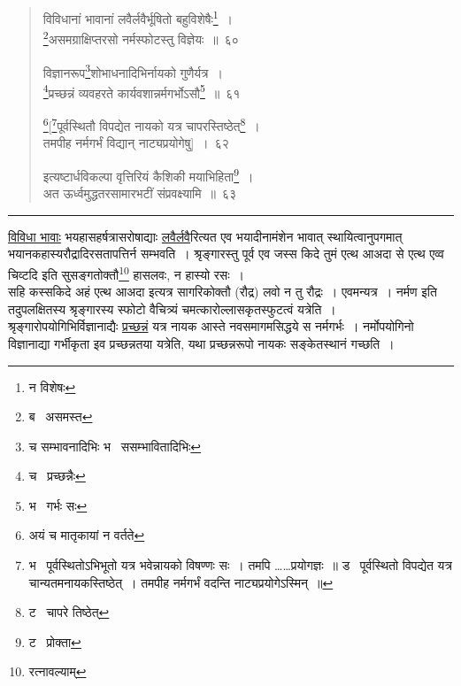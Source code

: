 \documentclass[11pt, openany]{book}
\begin{document}
\begin{quote}
{\na विविधानां भावानां लवैर्लवैर्भूषितो बहुविशेषैः\renewcommand{\thefootnote}{1}\footnote{न विशेषः}~।\\
\renewcommand{\thefootnote}{2}\footnote{ब \textendash\ असमस्त}असमग्राक्षिप्तरसो नर्मस्फोटस्तु विज्ञेयः~॥~६०

विज्ञानरूप\renewcommand{\thefootnote}{3}\footnote{च सम्भावनादिभिः भ \textendash\ ससम्भावितादिभिः}शोभाधनादिभिर्नायको गुणैर्यत्र~।\\
\renewcommand{\thefootnote}{4}\footnote{च \textendash\ प्रच्छन्नैः}प्रच्छन्नं व्यवहरते कार्यवशान्नर्मगर्भोऽसौ\renewcommand{\thefootnote}{5}\footnote{भ \textendash\ गर्भः सः}~॥~६१

\renewcommand{\thefootnote}{6}\footnote{अयं च मातृकायां न वर्तते}[\renewcommand{\thefootnote}{7}\footnote{भ \textendash\ पूर्वस्थितोऽभिभूतो यत्र भवेन्नायको विषण्णः सः~। तमपि \ldots \ldots प्रयोगज्ञः~॥ ड \textendash\ पूर्वस्थितो विपद्येत यत्र चान्यतमनायकस्तिष्ठेत्~। तमपीह नर्मगर्भं वदन्ति नाट्यप्रयोगेऽस्मिन्~॥}पूर्वस्थितौ विपद्येत नायको यत्र चापरस्तिष्ठेत्\renewcommand{\thefootnote}{8}\footnote{ट \textendash\ चापरे तिष्ठेत्}~।\\
तमपीह नर्मगर्भं विद्यान् नाट्यप्रयोगेषु]~।~६२

इत्यष्टार्धविकल्पा वृत्तिरियं कैशिकी मयाभिहिता\renewcommand{\thefootnote}{9}\footnote{ट \textendash\ प्रोक्ता}~।\\
अत ऊर्ध्वमुद्धतरसामारभटीं संप्रवक्ष्यामि~॥~६३}
\end{quote}

\hrule

\vspace{2mm}
\underline{विविधा भावाः} भयहासहर्षत्रासरोषाद्याः \underline{लवैर्लवै}रित्यत एव भयादीनामंशेन भावात् स्थायित्वानुपगमात् भयानकहास्यरौद्रादिरसतापत्तिर्न सम्भवति~। श्रृङ्गारस्तु पूर्व एव {\qt जस्स किदे तुमं एत्थ आअदा से एत्थ एव्व चिव्टदि} इति सुसङ्गतोक्तौ\renewcommand{\thefootnote}{*}\footnote{रत्नावल्याम्} हासलवः, न हास्यो रसः~।\\

{\qt सहि कस्सकिदे अहं एत्थ आअदा} इत्यत्र सागरिकोक्तौ (रौद्र) लवो न तु रौद्रः~। एवमन्यत्र~। नर्मण इति तदुपलक्षितस्य श्रृङ्गारस्य स्फोटो वैचित्र्यं चमत्कारोल्लासकृतस्फुटत्वं यत्रेति~।\\

श्रृङ्गारोपयोगिभिर्विज्ञानाद्यैः \underline{प्रच्छन्नं} यत्र नायक आस्ते नवसमागमसिद्धये स नर्मगर्भः~। नर्मोपयोगिनो विज्ञानाद्या गर्भीकृता इव प्रच्छन्नतया यत्रेति, यथा प्रच्छन्नरूपो नायकः सङ्केतस्थानं गच्छति~।
\end{document}
